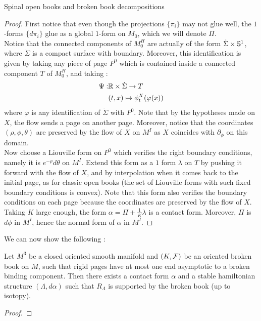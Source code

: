 \documentclass[../main.tex]{subfiles}
\begin{document}
\begin{section}{Spinal open books and broken book decompositions}
\begin{proof}
First notice that even though the projections $\{\pi_i\}$ may not glue well, the $1$-forms $\{d\pi_i\}$ glue as a global $1$-form on $M_0$, which we will denote $\Pi$.\\
Notice that the connected components of $M_0^H$ are actually of the form $\dot \Sigma \times \mathbb{S}^1$, where $\dot \Sigma$ is a compact surface with boundary. Moreover, this identification is given by taking any piece of page $P^0$ which is contained inside a connected component $T$ of $M_0^H$, and taking : \begin{align*}\Psi : &\mathbb{R} \times \dot \Sigma \rightarrow T\\
&(t,x) \mapsto \phi_t^X(\varphi(x)) \end{align*} where $\varphi$ is any identification of $\dot\Sigma$ with $P^0$. Note that by the hypotheses made on $X$, the flow sends a page on another page. Moreover, notice that the coordinates $(\rho,\phi,\theta)$ are preserved by the flow of $X$ on $M^I$ as $X$ coincides with $\partial_\phi$ on this domain.\\
Now choose a Liouville form on $P^0$ which verifies the right boundary conditions, namely it is $e^{-\rho}d\theta$ on $M^I$. Extend this form as a $1$ form $\lambda$ on $T$ by pushing it forward with the flow of $X$, and by interpolation when it comes back to the initial page, as for classic open books (the set of Liouville forms with such fixed boundary conditions is convex). Note that this form also verifies the boundary conditions on each page because the coordinates are preserved by the flow of $X$. \\
Taking $K$ large enough, the form $\alpha = \Pi + \frac{1}{K}\lambda$ is a contact form. Moreover, $\Pi$ is $d\phi$ in $M^I$, hence the normal form of $\alpha$ in $M^I$. 

\end{proof}

We can now show the following :

\begin{lemma}
Let $M^3$ be a closed oriented smooth manifold and $(K,\mathcal{F})$ be an oriented broken book on $M$, such that rigid pages have at most one end asymptotic to a broken binding component. Then there exists a contact form $\alpha$ and a stable hamiltonian structure $(\Lambda,d\alpha)$ such that $R_\Lambda$ is supported by the broken book (up to isotopy).
\end{lemma}

\begin{proof}


\end{proof}
\end{section}
\end{document}
